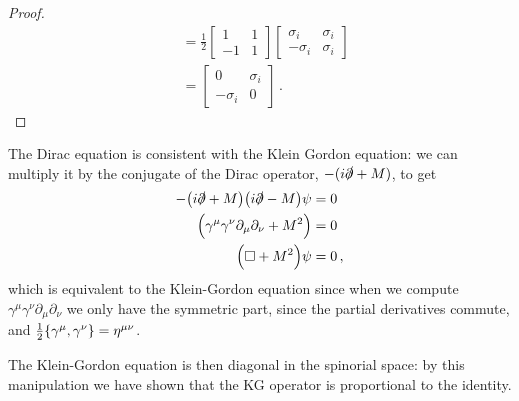 \documentclass[main.tex]{subfiles}
\begin{document}
\begin{proof}
\begin{subequations}
\begin{align}
&= \frac{1}{2} 
\left[\begin{array}{cc}
1 & 1 \\ 
-1 & 1
\end{array}\right]
\left[\begin{array}{cc}
\sigma_i  & \sigma_i  \\ 
- \sigma_i  & \sigma_i 
\end{array}\right]  \\
&= \left[\begin{array}{cc}
0 & \sigma_i  \\ 
-\sigma_i  & 0
\end{array}\right]
\,.
\end{align}
\end{subequations}
\end{proof}

The Dirac equation is consistent with the Klein Gordon equation: we can multiply it by the conjugate of the Dirac operator, \(-(i \slashed{\partial}+M)\), to get 
%
\begin{subequations}
\begin{align}
- \qty(i \slashed{\partial}+M) \qty(i \slashed{\partial}-M) \psi  &= 0\\
\qty( \gamma^{\mu } \gamma^{\nu } \partial_{\mu } \partial_{\nu } + M^2  ) &= 0   \\
\qty(\square + M^2) \psi &=0
\,,
\end{align}
\end{subequations}
%
which is equivalent to the Klein-Gordon equation since when we compute \(\gamma^{ \mu }  \gamma^{\nu } \partial_{\mu } \partial_{\nu }\) we only have the symmetric part, since the partial derivatives commute, and \(\frac{1}{2} \qty{\gamma^{\mu }, \gamma^{\nu }} = \eta^{\mu \nu }\). 

The Klein-Gordon equation is then diagonal in the spinorial space: by this manipulation we have shown that the KG operator is proportional to the identity. 
\end{document}
